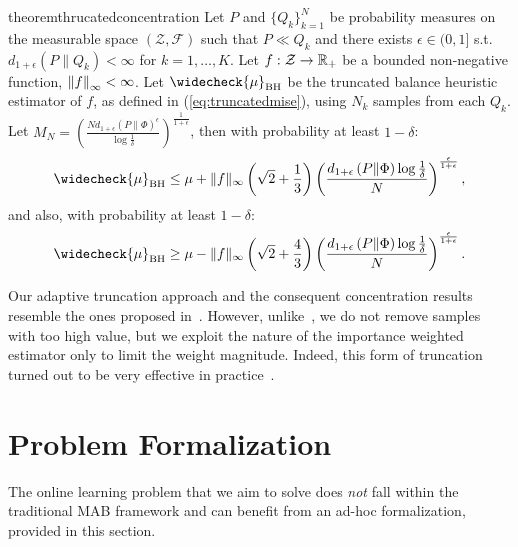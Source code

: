 \documentclass{article}
\begin{document}
\begin{restatable}{theorem}{thrucatedconcentration}\label{lem:thrucatedconcentration}
	Let $P$ and $\{ Q_k \}_{k=1}^N$ be probability measures on the measurable space $(\mathcal{Z},\mathcal{F})$ such that $P\ll Q_k$ and there exists $\epsilon \in (0,1]$ s.t. $d_{1+\epsilon}(P\|Q_k)<\infty$ for $k=1,\dots,K$. Let $f:\mathcal{Z}\to\Reals_{+}$ be a bounded non-negative function, \ie $\norm[\infty]{f}<\infty$. Let $\widecheck{\mu}_{\text{BH}}$ be the truncated balance heuristic estimator of $f$, as defined in (\ref{eq:truncatedmise}), using $N_k$ \iid samples from each $Q_k$. 
	Let $M_N = \left( \frac{N d_{1+\epsilon}\left( P \| \Phi  \right)^{\epsilon} }{\log \frac{1}{\delta}} \right) ^{\frac{1}{1+\epsilon}}$, then with probability at least $1-\delta$:
    \begin{equation*}\label{eq:1.1}
        \widecheck{\mu}_{\text{BH}} \le \mu + \|f\|_{\infty} \left(\sqrt{2} + \frac{1}{3} \right)  \left(\frac{ d_{1+\epsilon}\left( P \| \Phi  \right) \log  \frac{1}{\delta}  }{N} \right)^{\frac{\epsilon}{1+\epsilon}},
    \end{equation*}
    and also, with probability at least $1-\delta$:
    \begin{equation*}\label{eq:1.2}
        \widecheck{\mu}_{\text{BH}} \ge \mu - \|f\|_{\infty} \left(\sqrt{2} + \frac{4}{3} \right) \left(\frac{ d_{1+\epsilon}\left( P \| \Phi  \right) \log  \frac{1}{\delta}  }{N} \right)^{\frac{\epsilon}{1+\epsilon}}.
    \end{equation*}
\end{restatable}

Our adaptive truncation approach and the consequent concentration results resemble the ones proposed in~\citet{bubeck2013bandits}. However, unlike~\citet{bubeck2013bandits}, we do not remove samples with too high value, but we exploit the nature of the importance weighted estimator only to limit the weight magnitude. Indeed, this form of truncation turned out to be very effective in practice~\cite{ionides2008truncated,koblents2015population}.


\section{Problem Formalization}\label{sec:problem}
The online learning problem that we aim to solve does \textit{not} fall within the traditional MAB framework and can benefit from an ad-hoc formalization, provided in this section.
\end{document}
